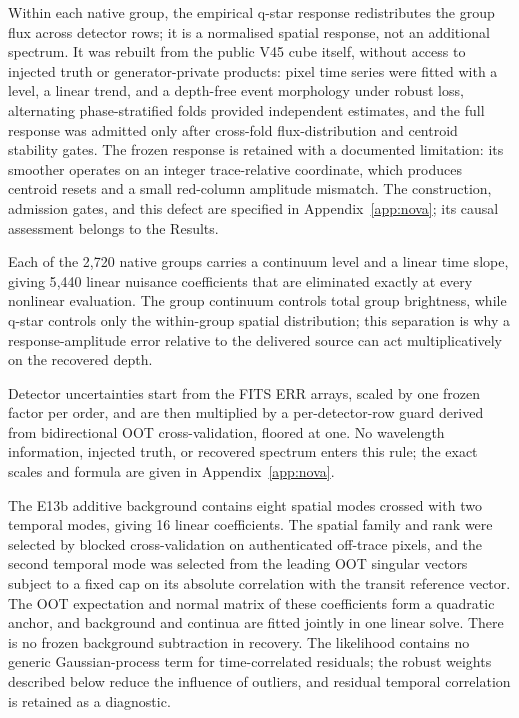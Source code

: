 
Within each native group, the empirical q-star response redistributes the
group flux across detector rows; it is a normalised spatial response, not an
additional spectrum. It was rebuilt from the public V45 cube itself, without
access to injected truth or generator-private products: pixel time series
were fitted with a level, a linear trend, and a depth-free event morphology
under robust loss, alternating phase-stratified folds provided independent
estimates, and the full response was admitted only after cross-fold
flux-distribution and centroid stability gates. The frozen response is
retained with a documented limitation: its smoother operates on an integer
trace-relative coordinate, which produces centroid resets and a small
red-column amplitude mismatch. The construction, admission gates, and this
defect are specified in Appendix~\ref{app:nova}; its causal assessment
belongs to the Results.

Each of the 2{,}720 native groups carries a continuum level and a linear
time slope, giving 5{,}440 linear nuisance coefficients that are eliminated
exactly at every nonlinear evaluation. The group continuum controls total
group brightness, while q-star controls only the within-group spatial
distribution; this separation is why a response-amplitude error relative to
the delivered source can act multiplicatively on the recovered depth.

Detector uncertainties start from the FITS ERR arrays, scaled by one frozen
factor per order, and are then multiplied by a per-detector-row guard
derived from bidirectional OOT cross-validation, floored at one. No
wavelength information, injected truth, or recovered spectrum enters this
rule; the exact scales and formula are given in Appendix~\ref{app:nova}.

The E13b additive background contains eight spatial modes crossed with two
temporal modes, giving 16 linear coefficients. The spatial family and rank
were selected by blocked cross-validation on authenticated off-trace pixels,
and the second temporal mode was selected from the leading OOT singular
vectors subject to a fixed cap on its absolute correlation with the transit
reference vector. The OOT expectation and normal matrix of these
coefficients form a quadratic anchor, and background and continua are fitted
jointly in one linear solve. There is no frozen background subtraction in
recovery. The likelihood contains no generic Gaussian-process term for
time-correlated residuals; the robust weights described below reduce the
influence of outliers, and residual temporal correlation is retained as a
diagnostic.

